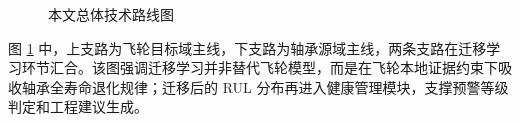 \begin{figure}[H]
{
  }
  \caption{本文总体技术路线图}
  \label{fig:overall_roadmap}
\end{figure}

图 \ref{fig:overall_roadmap} 中，上支路为飞轮目标域主线，下支路为轴承源域主线，两条支路在迁移学习环节汇合。该图强调迁移学习并非替代飞轮模型，而是在飞轮本地证据约束下吸收轴承全寿命退化规律；迁移后的 RUL 分布再进入健康管理模块，支撑预警等级判定和工程建议生成。
